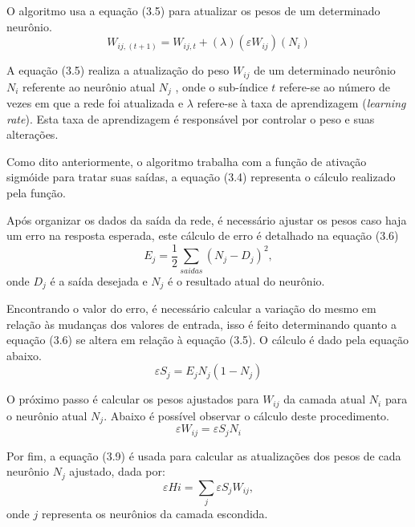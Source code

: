 O algoritmo usa a equação (3.5) para atualizar os pesos de um determinado neurônio.
\begin{equation}\label{eq:backpropagation-ajuste-pesos}
W_{ij,(t+1)} = W_{ij, t} + (\lambda)(\varepsilon W_{ij})(N_i)
\end{equation}

A equação (3.5) realiza a atualização do peso $W_{ij}$ de um determinado neurônio $N_i$ referente ao neurônio atual $N_j$ , onde o sub-índice $t$ refere-se ao número de vezes em que a rede foi atualizada e $\lambda$ refere-se à taxa de aprendizagem (\textit{learning rate}). Esta taxa de aprendizagem é responsável por controlar o peso e suas alterações.

Como dito anteriormente, o algoritmo trabalha com a função de ativação sigmóide para tratar suas saídas, a equação (3.4) representa o cálculo realizado pela função.

Após organizar os dados da saída da rede, é necessário ajustar os pesos caso haja um erro na resposta esperada, este cálculo de erro é detalhado na equação (3.6)
\begin{equation}\label{eq:backpropagation-calculo-erro}
E_j = \frac{1}{2} \sum_{saidas} (N_j - D_j)^2,
\end{equation}
onde $D_j$ é a saída desejada e $N_j$ é o resultado atual do neurônio. 	

Encontrando o valor do erro, é necessário calcular a variação do mesmo em relação às mudanças dos valores de entrada, isso é feito determinando quanto a equação (3.6) se altera em relação à equação (3.5). O cálculo é dado pela equação abaixo.
\begin{equation}\label{eq:backpropagation-calculo-erro-diferença}
\varepsilon S_{j} = E_j N_j (1 - N_j)
\end{equation}

O próximo passo é calcular os pesos ajustados para $W_{ij}$ da camada atual $N_i$ para o neurônio atual $N_j$. Abaixo é possível observar o cálculo deste procedimento.
\begin{equation}\label{eq:backpropagation-ajustes-erro}
\varepsilon W_{ij} = \varepsilon S_j N_i
\end{equation}

Por fim, a equação (3.9) é usada para calcular as atualizações dos pesos de cada neurônio $N_j$ ajustado, dada por:
\begin{equation}\label{eq:backpropagation-ajustes-erro-propagacao}
\varepsilon Hi = \sum_{j} \varepsilon S_{j}W_{ij},
\end{equation}
onde $j$ representa os neurônios da camada escondida.

